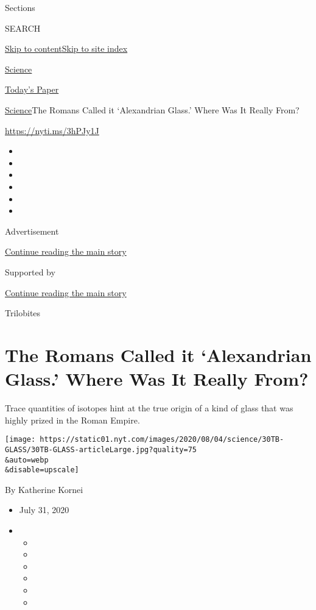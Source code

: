 Sections

SEARCH

\protect\hyperlink{site-content}{Skip to
content}\protect\hyperlink{site-index}{Skip to site index}

\href{https://www.nytimes.com/section/science}{Science}

\href{https://myaccount.nytimes.com/auth/login?response_type=cookie\&client_id=vi}{}

\href{https://www.nytimes.com/section/todayspaper}{Today's Paper}

\href{/section/science}{Science}\textbar{}The Romans Called it
`Alexandrian Glass.' Where Was It Really From?

\url{https://nyti.ms/3hPJy1J}

\begin{itemize}
\item
\item
\item
\item
\item
\item
\end{itemize}

Advertisement

\protect\hyperlink{after-top}{Continue reading the main story}

Supported by

\protect\hyperlink{after-sponsor}{Continue reading the main story}

Trilobites

\hypertarget{the-romans-called-it-alexandrian-glass-where-was-it-really-from}{%
\section{The Romans Called it `Alexandrian Glass.' Where Was It Really
From?}\label{the-romans-called-it-alexandrian-glass-where-was-it-really-from}}

Trace quantities of isotopes hint at the true origin of a kind of glass
that was highly prized in the Roman Empire.

\texttt{[image: https://static01.nyt.com/images/2020/08/04/science/30TB-GLASS/30TB-GLASS-articleLarge.jpg?quality=75\\\&auto=webp\\\&disable=upscale]}

By Katherine Kornei

\begin{itemize}
\item
  July 31, 2020
\item
  \begin{itemize}
  \item
  \item
  \item
  \item
  \item
  \item
  \end{itemize}
\end{itemize}

